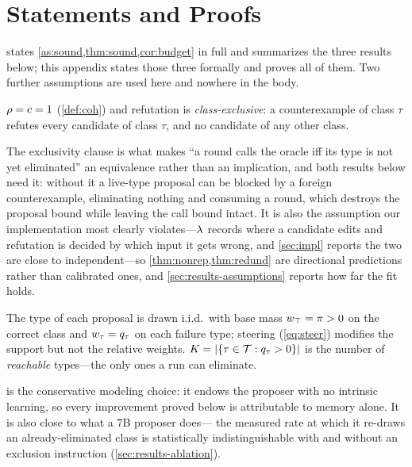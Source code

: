 \section{Statements and Proofs}
\label{app:proofs}

 states \cref{as:sound,thm:sound,cor:budget} in full and
summarizes the three results below; this appendix states those three formally
and proves all of them. Two further assumptions are used here and nowhere in
the body.

\begin{assumption}
\label{as:ideal}
$\rho = c = 1$ (\cref{def:coh}) and refutation is \emph{class-exclusive}: a
counterexample of class $\tau$ refutes every candidate of class $\tau$, and no
candidate of any other class.
\end{assumption}

The exclusivity clause is what makes ``a round calls the oracle iff its type is
not yet eliminated'' an equivalence rather than an implication, and both
results below need it: without it a live-type proposal can be blocked by a
foreign counterexample, eliminating nothing and consuming a round, which
destroys the proposal bound while leaving the call bound intact. It is also the
assumption our implementation most clearly violates---$\lambda$ records where a
candidate edits and refutation is decided by which input it gets wrong, and
\cref{sec:impl} reports the two are close to independent---so
\cref{thm:nonrep,thm:redund} are directional predictions rather than
calibrated ones, and \cref{sec:results-assumptions} reports how far the fit
holds.

\begin{assumption}
\label{as:memoryless}
The type of each proposal is drawn i.i.d.\ with base mass $w_\top = \pi >
0$ on the correct class and $w_\tau = q_\tau$ on each failure type;
steering (\cref{eq:steer}) modifies the support but not the relative weights.
$K = \lvert\{\tau \in \mathcal{T} : q_\tau > 0\}\rvert$ is the number of
\emph{reachable} types---the only ones a run can eliminate.
\end{assumption}

 is the conservative modeling choice: it endows the
proposer with no intrinsic learning, so every improvement proved below is
attributable to memory alone. It is also close to what a $7$B proposer does---%
the measured rate at which it re-draws an already-eliminated class is
statistically indistinguishable with and without an exclusion instruction
(\cref{sec:results-ablation}).

